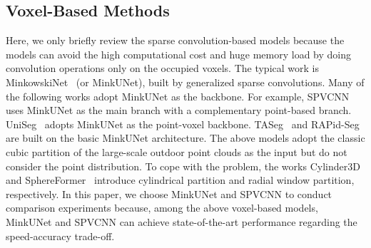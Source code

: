 \subsection{Voxel-Based Methods}
Here, we only briefly review the sparse convolution-based models because the models can avoid the high computational cost and huge memory load by doing convolution operations only on the occupied voxels. The typical work is MinkowskiNet~\cite{minkowski2019} (or MinkUNet), built by generalized sparse convolutions. Many of the following works adopt MinkUNet as the backbone. For example, SPVCNN~\cite{spvnas_2020} uses MinkUNet as the main branch with a complementary point-based branch. UniSeg~\cite{openpcseg2023} adopts MinkUNet as the point-voxel backbone. TASeg~\cite{taseg24} and RAPid-Seg~\cite{rapid25} are built on the basic MinkUNet architecture. The above models adopt the classic cubic partition of the large-scale outdoor point clouds as the input but do not consider the point distribution. To cope with the problem, the works Cylinder3D~\cite{cylindrical3d2021} and SphereFormer~\cite{spherical_transformer_2023} introduce cylindrical partition and radial window partition, respectively. In this paper, we choose MinkUNet and SPVCNN to conduct comparison experiments because, among the above voxel-based models, MinkUNet and SPVCNN can achieve state-of-the-art performance regarding the speed-accuracy trade-off.


